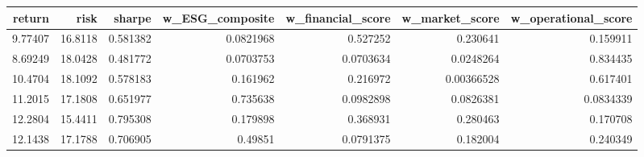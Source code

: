 \begin{tabular}{rrrrrrr}
\toprule
return & risk & sharpe & w_ESG_composite & w_financial_score & w_market_score & w_operational_score \\
\midrule
9.77407 & 16.8118 & 0.581382 & 0.0821968 & 0.527252 & 0.230641 & 0.159911 \\
8.69249 & 18.0428 & 0.481772 & 0.0703753 & 0.0703634 & 0.0248264 & 0.834435 \\
10.4704 & 18.1092 & 0.578183 & 0.161962 & 0.216972 & 0.00366528 & 0.617401 \\
11.2015 & 17.1808 & 0.651977 & 0.735638 & 0.0982898 & 0.0826381 & 0.0834339 \\
12.2804 & 15.4411 & 0.795308 & 0.179898 & 0.368931 & 0.280463 & 0.170708 \\
12.1438 & 17.1788 & 0.706905 & 0.49851 & 0.0791375 & 0.182004 & 0.240349 \\
\bottomrule
\end{tabular}
